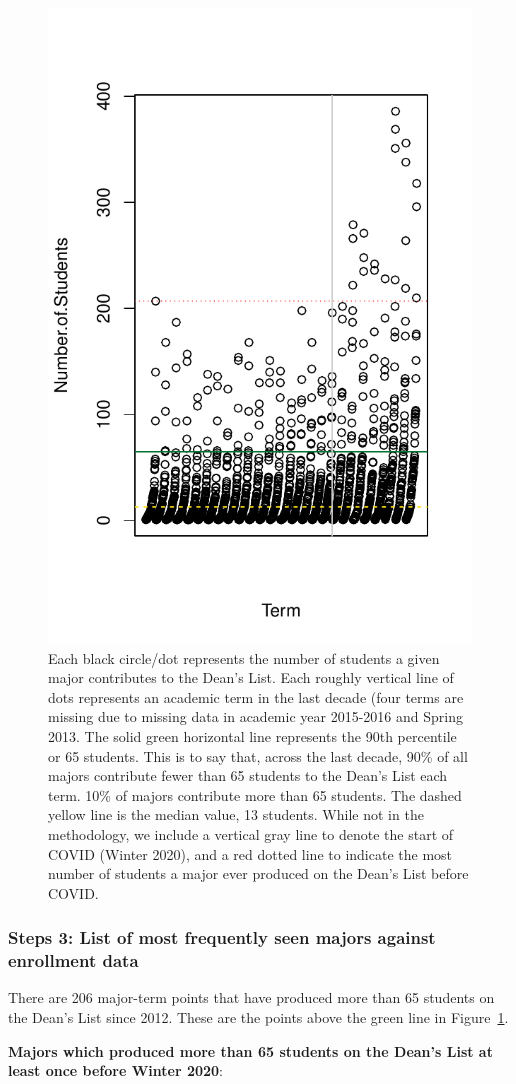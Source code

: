 \documentclass[10pt]{article}
\begin{document}
\begin{figure}[H]
	\centering
	\includegraphics[width=0.42\linewidth]{../visualizations/contributions-by-major2}
	\caption{Each black circle/dot represents the number of students a given major contributes to the Dean's List. Each roughly vertical line of dots represents an academic term in the last decade (four terms are missing due to missing data in academic year 2015-2016 and Spring 2013. The solid green horizontal line represents the 90th percentile or 65 students. This is to say that, across the last decade, 90\% of all majors contribute fewer than 65 students to the Dean's List each term. 10\% of majors contribute more than 65 students. The dashed yellow line is the median value, 13 students. While not in the methodology, we include a vertical gray line to denote the start of COVID (Winter 2020), and a red dotted line to indicate the most number of students a major ever produced on the Dean's List before COVID. }
	\label{fig:contributions-by-major}
\end{figure}


\subsubsection{Steps 3: List of most frequently seen majors against enrollment data}

There are 206 major-term points that have produced more than 65 students  on the Dean's List since 2012. These are the points above the green line in Figure~\ref{fig:contributions-by-major}.


\textbf{Majors which produced more than 65 students on the Dean's List at least once before Winter 2020}:
\end{document}
